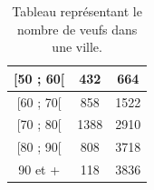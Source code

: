 \begin{defi}
\begin{itemize}
\begin{ex}
\begin{itemize}
\begin{table}[H]
\begin{tabular}{|c|c|c|}
                                                            [50 ; 60[ & 432 & 664 \\ 
                                                            \hline 
                                                            [60 ; 70[ & 858 & 1522 \\ 
                                                            \hline 
                                                            [70 ; 80[ & 1388 & 2910 \\ 
                                                            \hline 
                                                            [80 ; 90[ & 808 & 3718 \\ 
                                                            \hline 
                                                            90 et + & 118 & 3836 \\ 
                                                            \hline 
                                                            \end{tabular} 
                                                            \caption{Tableau repr\'esentant le nombre de veufs dans une ville.}
                                                            \label{tab:veufs}
                                                            \end{table}
                                                            

\end{itemize}
\end{ex}
\end{itemize}
\end{defi}
